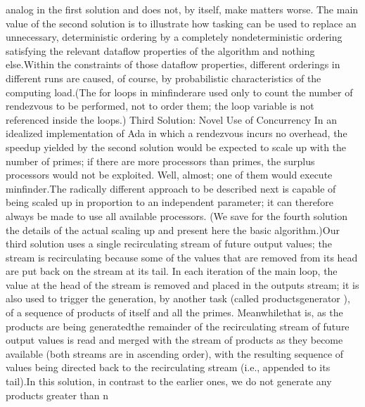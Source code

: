 analog in the first solution and does not, by itself, make matters
worse. The main value of the second solution is to illustrate how
tasking can be used to replace an unnecessary, deterministic ordering
by a completely nondeterministic ordering satisfying the relevant
dataflow properties of the algorithm and nothing else.\NtFoot[]%
\NtNtpar[]Within the constraints of those dataflow properties, different
orderings in different runs are caused, of course, by probabilistic
characteristics of the computing load.\NtEndntpar[]\NtEndfoot[] (The
for loops in \tyxffmxmono[]min\Symuns[]finder\tyxffmxendmono[] are
used only to count the number of rendezvous to be performed, not to
order them; the loop variable is not referenced inside the loops.)%
\Endpara[]
\DivEndiv[]
\DivLiv[]\HdMinLiv[]Third Solution: Novel Use of Concurrency%
\HdMinEndiv[]
\Para[]In an idealized implementation of Ada in which a rendezvous
incurs no overhead, the speedup yielded by the second solution would
be expected to scale up with the number of primes; if there are more
processors than primes, the surplus processors would not be exploited.%
\NtFoot[]\NtNtpar[]Well, almost; one of them would execute %
\tyxffmxmono[]min\Symuns[]finder\tyxffmxendmono[].\NtEndntpar[]%
\NtEndfoot[] The radically different approach to be described next
is capable of being scaled up in proportion to an independent parameter;
it can therefore always be made to use all available processors. (We
save for the fourth solution the details of the actual scaling up
and present here the basic algorithm.)\Endpara[]
\Para[]Our third solution uses a single recirculating stream of future
output values; the stream is recirculating because some of the values
that are removed from its head are put back on the stream at its tail.
In each iteration of the main loop, the value at the head of the stream
is removed and placed in the \tyxffmxmono[]outputs%
\tyxffmxendmono[] stream; it is also used to trigger the generation,
by another task (called \tyxffmxmono[]products\Symuns[]generator%
\tyxffmxendmono[]), of a sequence of products of itself and all the
primes. Meanwhile\EmDash[]that is, as the products are being generated\EmDash[]the
remainder of the recirculating stream of future output values is read
and merged with the stream of products as they become available (both
streams are in ascending order), with the resulting sequence of values
being directed back to the recirculating stream (i.e., appended to
its tail).\Endpara[]
\Para[]In this solution, in contrast to the earlier ones, we do not
generate any products greater than \tyxffmxmono[]n%
